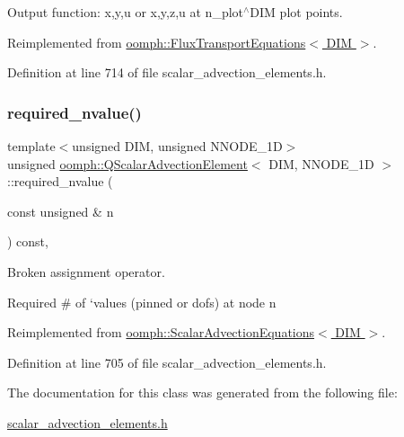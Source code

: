 Output function\+: x,y,u or x,y,z,u at n\+\_\+plot$^\wedge$\+D\+IM plot points. 



Reimplemented from \hyperlink{classoomph_1_1FluxTransportEquations_a6b9ea1eb9feb8c71c1d935c52e7d896f}{oomph\+::\+Flux\+Transport\+Equations$<$ D\+I\+M $>$}.



Definition at line 714 of file scalar\+\_\+advection\+\_\+elements.\+h.

\mbox{\label{classoomph_1_1QScalarAdvectionElement_a967897f5171c0b1e03a1f85d40025959}} 
\subsubsection{\texorpdfstring{required\+\_\+nvalue()}{required\_nvalue()}}
{\footnotesize\ttfamily template$<$unsigned D\+IM, unsigned N\+N\+O\+D\+E\+\_\+1D$>$ \\
unsigned \hyperlink{classoomph_1_1QScalarAdvectionElement}{oomph\+::\+Q\+Scalar\+Advection\+Element}$<$ D\+IM, N\+N\+O\+D\+E\+\_\+1D $>$\+::required\+\_\+nvalue (\begin{DoxyParamCaption}\item[{const unsigned \&}]{n }\end{DoxyParamCaption}) const\hspace{0.3cm}{\ttfamily [inline]}, {\ttfamily [virtual]}}



Broken assignment operator. 

Required \# of `values\textquotesingle{} (pinned or dofs) at node n 

Reimplemented from \hyperlink{classoomph_1_1ScalarAdvectionEquations_a71a3c28feb1156376cbf55e7043e27e8}{oomph\+::\+Scalar\+Advection\+Equations$<$ D\+I\+M $>$}.



Definition at line 705 of file scalar\+\_\+advection\+\_\+elements.\+h.



The documentation for this class was generated from the following file\+:\begin{DoxyCompactItemize}
\item 
\hyperlink{scalar__advection__elements_8h}{scalar\+\_\+advection\+\_\+elements.\+h}\end{DoxyCompactItemize}
